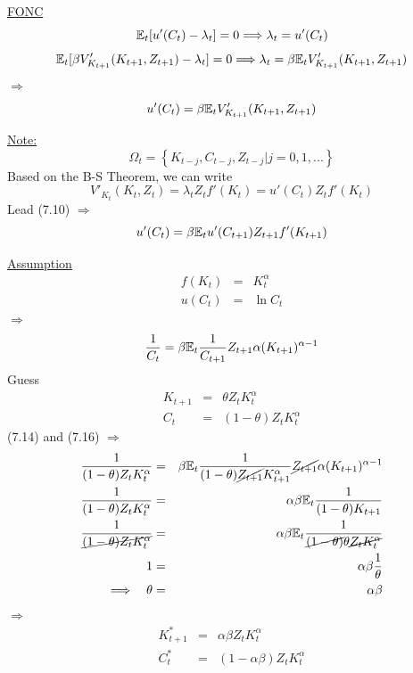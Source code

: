 \documentclass[twoside]{article}
\newcommand\imp{$\Longrightarrow$}
\newcommand\lcb{\left \{}
\newcommand\rcb{\right \}}
\begin{document}
\underline{FONC}
\begin{equation}
    \mathbb{E}_{t}[u'(C_{t}) - \lambda_{t}] = 0 \Longrightarrow \lambda_{t} = u'(C_{t})
\end{equation}
\begin{equation}
    \mathbb{E}_{t}[\beta V'_{K_{t+1}}(K_{t+1}, Z_{t+1}) - \lambda_{t} ] = 0 \Longrightarrow \lambda_{t} = \beta \mathbb{E}_{t} V'_{K_{t+1}}(K_{t+1}, Z_{t+1})
\end{equation}
\imp
\begin{equation}
    u'(C_{t}) = \beta \mathbb{E}_t V'_{K_{t+1}}(K_{t+1}, Z_{t+1})
\end{equation}

\underline{Note:}
\begin{equation}
    \Omega_{t} = \lcb K_{t-j}, C_{t-j}, Z_{t-j} | j = 0,1,...  \rcb
\end{equation}
Based on the B-S Theorem, we can write
\begin{equation}
    V'_{K_{t}}(K_{t}, Z_{t}) = \lambda_{t} Z_{t} f'(K_{t}) = u'(C_{t} )Z_{t} f'(K_{t})
\end{equation}
Lead (7.10) \imp
\begin{equation}
    u'(C_{t}) = \beta \mathbb{E}_{t} u'(C_{t+1} )Z_{t+1} f'(K_{t+1})
\end{equation}

\underline{Assumption}
\begin{eqnarray}
    f(K_{t}) &=& K_{t}^{\alpha}\\
    u(C_{t}) &=& \ln C_{t}
\end{eqnarray}
\imp
\begin{equation}
    \frac{1}{C_{t}} = \beta \mathbb{E}_{t} \frac{1}{C_{t+1}} Z_{t+1} \alpha (K_{t+1})^{\alpha - 1}
\end{equation}
Guess
\begin{eqnarray}
    K_{t+1} &=& \theta Z_{t} K_{t}^{\alpha}\\
    C_{t}   &=& (1- \theta)Z_{t}K_{t}^{\alpha}
\end{eqnarray}
(7.14) and (7.16) \imp
\begin{eqnarray}
    \frac{1}{(1- \theta)Z_{t}K_{t}^{\alpha}} &=& \beta \mathbb{E}_{t} \frac{1}{(1- \theta)\cancel{Z_{t+1}}K_{t+1}^{\alpha}} \cancel{Z_{t+1}} \alpha (K_{t+1})^{\alpha - 1}\\
    \frac{1}{(1- \theta)Z_{t}K_{t}^{\alpha}} &=& \alpha \beta \mathbb{E}_{t} \frac{1}{(1- \theta) K_{t+1}}\\
    \frac{1}{\cancel{(1- \theta)Z_{t}K_{t}^{\alpha}}} &=& \alpha \beta \mathbb{E}_{t} \frac{1}{\cancel{(1- \theta)} \theta \cancel{ Z_{t} K_{t}^{\alpha}}}\\
    1 &=& \alpha \beta \frac{1}{\theta}\\
    \Longrightarrow \quad \theta   &=& \alpha \beta
\end{eqnarray}
\imp
\begin{eqnarray}
    K^{*}_{t+1} &=& \alpha \beta Z_{t} K_{t}^{\alpha}\\
    C^{*}_{t}   &=& (1- \alpha \beta)Z_{t}K_{t}^{\alpha}
\end{eqnarray}
\end{document}
